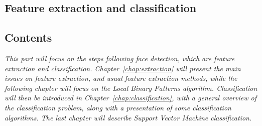   \begin{titlepage}
    \vspace*{\fill}
      \part{Feature extraction and classification}
    \vspace*{\fill}
  \end{titlepage}

\startcontents[parts]

\chapter*{Contents}

\textit{This part will focus on the steps following face detection, which are feature extraction and classification. Chapter~\ref{chap:extraction} will present the main issues on feature extraction, and usual feature extraction methods, while the following chapter will focus on the Local Binary Patterns algorithm. Classification will then be introduced in Chapter~\ref{chap:classification}, with a general overview of the classification problem, along with a presentation of some classification algorithms. The last chapter will describe Support Vector Machine classification.} 

\vspace{\baselineskip}


\pagebreak


\newpage

\pagebreak
\newpage

\newpage


\stopcontents[parts]


